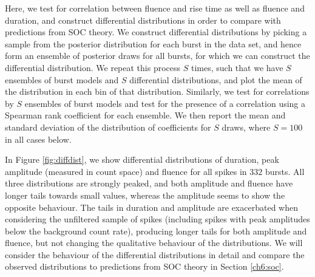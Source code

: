 \documentclass[12pt]{emulateapj}
\begin{document}
 Here, we test for correlation between fluence and rise time as well as fluence and duration, and construct differential distributions
 in order to compare with predictions from SOC theory. We construct differential distributions by picking a sample from the posterior distribution
 for each burst in the data set, and hence form an ensemble of posterior draws for all bursts, for which we can construct the differential distribution.
 We repeat this process $S$ times, such that we have $S$ ensembles of burst models and $S$ differential distributions, and plot the mean of the distribution in
 each bin of that distribution. 
 Similarly, we test for correlations by $S$ ensembles of burst models and test for the presence of a correlation using a Spearman rank
 coefficient for each ensemble. We then report the mean and standard deviation of the distribution of coefficients for $S$ draws, where $S = 100$ in all cases below.


 In Figure \ref{fig:diffdist}, we show differential distributions of duration, peak amplitude (measured in count space) and fluence for all spikes in $332$ bursts. All three distributions are
 strongly peaked, and both amplitude and fluence have longer tails towards small values, whereas the amplitude seems to show the opposite behaviour. The 
 tails in duration and amplitude are exacerbated when considering the unfiltered sample of 
 spikes (including spikes with peak amplitudes below the background count rate), producing longer tails for both amplitude and fluence, but not changing the qualitative behaviour 
 of the distributions. We will consider the behaviour of
 the differential distributions in detail and compare the observed distributions to predictions from SOC theory in Section \ref{ch6:soc}.
\end{document}
